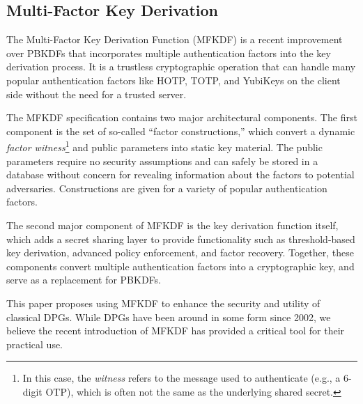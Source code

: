 \subsection{Multi-Factor Key Derivation}
The Multi-Factor Key Derivation Function (MFKDF) \cite{mfkdf} is a recent improvement over PBKDFs that incorporates multiple authentication factors into the key derivation process. It is a trustless cryptographic operation that can handle many popular authentication factors like HOTP, TOTP, and YubiKeys on the client side without the need for a trusted server.

The MFKDF specification contains two major architectural components. The first component is the set of so-called ``factor constructions,'' which convert a dynamic \textit{factor witness}\footnote{In this case, the \textit{witness} refers to the message used to authenticate (e.g., a 6-digit OTP), which is often not the same as the underlying shared secret.} and public parameters into static key material. The public parameters require no security assumptions and can safely be stored in a database without concern for revealing information about the factors to potential adversaries. Constructions are given for a variety of popular authentication factors.

The second major component of MFKDF is the key derivation function itself, which adds a secret sharing layer to provide functionality such as threshold-based key derivation, advanced policy enforcement, and factor recovery. Together, these components convert multiple authentication factors into a cryptographic key, and serve as a replacement for PBKDFs. 

This paper proposes using MFKDF to enhance the security and utility of classical DPGs. While DPGs have been around in some form since 2002, we believe the recent introduction of MFKDF has provided a critical tool for their practical use.

\eject